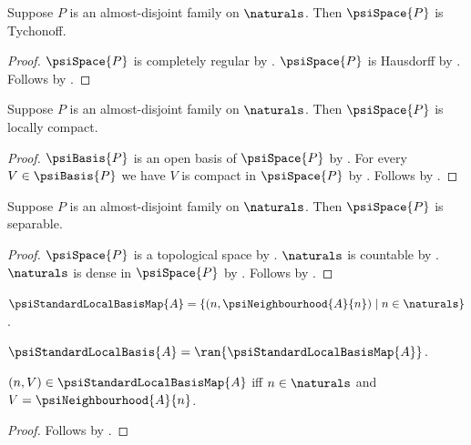 \begin{theorem}\label{psi_space_is_tychonoff}
    Suppose $P$ is an almost-disjoint family on $\naturals$.
    Then $\psiSpace{P}$ is Tychonoff.
\end{theorem}
\begin{proof}
    $\psiSpace{P}$ is completely regular
        by .
    $\psiSpace{P}$ is Hausdorff by .
    Follows by .
\end{proof}

\begin{theorem}\label{psi_space_is_locally_compact}
    Suppose $P$ is an almost-disjoint family on $\naturals$.
    Then $\psiSpace{P}$ is locally compact.
\end{theorem}
\begin{proof}
    $\psiBasis{P}$ is an open basis of $\psiSpace{P}$
        by .
    For every $V\in\psiBasis{P}$ we have
        $V$ is compact in $\psiSpace{P}$ by .
    Follows by .
\end{proof}

\begin{theorem}\label{psi_space_is_separable}
    Suppose $P$ is an almost-disjoint family on $\naturals$.
    Then $\psiSpace{P}$ is separable.
\end{theorem}
\begin{proof}
    $\psiSpace{P}$ is a topological space
        by .
    $\naturals$ is countable by .
    $\naturals$ is dense in $\psiSpace{P}$ by .
    Follows by .
\end{proof}

\begin{definition}\label{psi_standard_local_basis_map}
    $\psiStandardLocalBasisMap{A}=
        \{(n,\psiNeighbourhood{A}{n})\mid n\in\naturals\}$.
\end{definition}

\begin{definition}\label{psi_standard_local_basis}
    $\psiStandardLocalBasis{A}=\ran{\psiStandardLocalBasisMap{A}}$.
\end{definition}

\begin{proposition}\label{psi_standard_local_basis_map_membership}
    $(n,V)\in\psiStandardLocalBasisMap{A}$ iff
        $n\in\naturals$ and $V=\psiNeighbourhood{A}{n}$.
\end{proposition}
\begin{proof}
    Follows by .
\end{proof}

